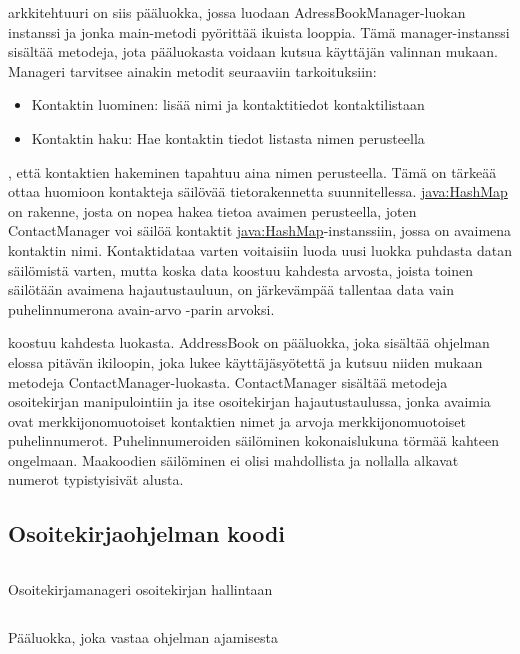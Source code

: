 \documentclass{tufte-book}
\newcommand{\java}[1]{\underline{\gls{java:#1}}}
\newcommand{\code}[3]{
\begin{listing}
    \inputminted{java}{OhjelmointiopasEsimerkit/src/#1/#2.java}
    \caption{#3}
    \label{Java-#1-#2}
\end{listing}
}
\begin{document}
 arkkitehtuuri on siis pääluokka, jossa luodaan
AdressBookManager-luokan instanssi ja jonka main-metodi pyörittää ikuista looppia. Tämä 
manager-instanssi sisältää metodeja, jota pääluokasta voidaan kutsua käyttäjän valinnan mukaan.
Manageri tarvitsee ainakin metodit seuraaviin tarkoituksiin:

\begin{itemize}
	\item Kontaktin luominen: lisää nimi ja kontaktitiedot kontaktilistaan
	\item Kontaktin haku: Hae kontaktin tiedot listasta nimen perusteella
\end{itemize}

, että kontaktien hakeminen tapahtuu aina nimen perusteella. Tämä on
tärkeää ottaa huomioon kontakteja säilövää tietorakennetta suunnitellessa. \java{HashMap} on
rakenne, josta on nopea hakea tietoa avaimen perusteella, joten ContactManager voi säilöä
kontaktit \java{HashMap}-instanssiin, jossa on avaimena kontaktin nimi. Kontaktidataa varten
voitaisiin luoda uusi luokka puhdasta datan säilömistä varten, mutta koska data koostuu kahdesta
arvosta, joista toinen säilötään avaimena hajautustauluun, on järkevämpää tallentaa data vain
puhelinnumerona avain-arvo -parin arvoksi.

 koostuu kahdesta luokasta. AddressBook on pääluokka, joka sisältää
ohjelman elossa pitävän ikiloopin, joka lukee käyttäjäsyötettä ja kutsuu niiden mukaan metodeja
ContactManager-luokasta. ContactManager sisältää metodeja osoitekirjan manipulointiin ja
itse osoitekirjan hajautustaulussa, jonka avaimia ovat merkkijonomuotoiset kontaktien nimet ja
arvoja merkkijonomuotoiset puhelinnumerot. Puhelinnumeroiden säilöminen kokonaislukuna törmää
kahteen ongelmaan. Maakoodien säilöminen ei olisi mahdollista ja nollalla alkavat numerot
typistyisivät alusta.


\subsection{Osoitekirjaohjelman koodi}
\label{osoitekirja koodi}

\code{week3/addressbookexample}{ContactManager}{Osoitekirjamanageri osoitekirjan hallintaan}
\code{week3/addressbookexample}{AddressBook}{Pääluokka, joka vastaa ohjelman ajamisesta}

\end{document}
